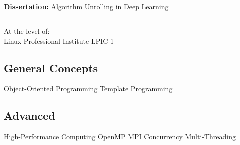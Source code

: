 \documentclass[a4paper]{MagicalCV}
\begin{document}
\begin{minipage}[t]{0.33\textwidth}




\textbf{Dissertation: }
Algorithm Unrolling in Deep Learning
\sectionsep


\subsection{}
At the level of:\\Linux Professional Institute LPIC-1  
\sectionsep


\subsection{General Concepts}
Object-Oriented Programming \textbullet{} Template Programming \textbullet{}  
\sectionsep
\subsection{Advanced}
High-Performance Computing \textbullet{} \textbullet{} OpenMP \textbullet{} MPI \textbullet{} Concurrency \textbullet{} Multi-Threading \textbullet{}
\sectionsep



\end{minipage}
\end{document}
